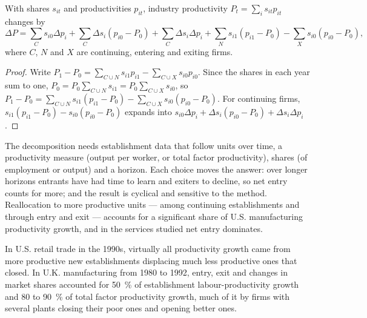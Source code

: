 \begin{proposition}\label{prop:b3:platforms-and-innovation:fhk}
With shares $s_{it}$ and productivities $p_{it}$, industry productivity $P_t = \sum_i s_{it}p_{it}$ changes by
\[
\Delta P = \sum_{C} s_{i0}\Delta p_i + \sum_{C}\Delta s_i (p_{i0} - P_0) + \sum_{C}\Delta s_i\Delta p_i
  + \sum_{N} s_{i1}(p_{i1} - P_0) - \sum_{X} s_{i0}(p_{i0} - P_0),
\]
where $C$, $N$ and $X$ are continuing, entering and exiting firms.
\end{proposition}

\begin{proof}
Write $P_1 - P_0 = \sum_{C\cup N} s_{i1}p_{i1} - \sum_{C\cup X} s_{i0}p_{i0}$. Since the shares in each year sum to one, $P_0 = P_0\sum_{C\cup N}s_{i1} = P_0\sum_{C\cup X}s_{i0}$,
so $P_1 - P_0 = \sum_{C\cup N}s_{i1}(p_{i1} - P_0) - \sum_{C\cup X}s_{i0}(p_{i0} - P_0)$. For continuing firms, $s_{i1}(p_{i1} - P_0) - s_{i0}(p_{i0} - P_0)$ expands
into $s_{i0}\Delta p_i + \Delta s_i(p_{i0} - P_0) + \Delta s_i \Delta p_i$.
\end{proof}

\begin{measure}
The decomposition needs establishment data that follow units over time, a
productivity measure (output per worker, or total factor productivity), shares
(of employment or output) and a horizon. Each choice moves the answer: over longer
horizons entrants have had time to learn and exiters to decline, so net entry counts
for more; and the result is cyclical and sensitive to the method. %
Reallocation to more productive units --- among continuing establishments and
through entry and exit --- accounts for a significant share of U.S. manufacturing
productivity growth, and in the services studied net entry dominates.
\end{measure}

\begin{record}
In U.S. retail trade in the 1990s, virtually all productivity growth came from more
productive new establishments displacing much less productive ones that closed. %
In U.K. manufacturing from 1980 to 1992, entry, exit and changes in market shares accounted for
50~\% of establishment labour-productivity growth and 80 to 90~\% of total factor productivity
growth, much of it by firms with several plants closing their poor ones and opening
better ones. %
\end{record}

